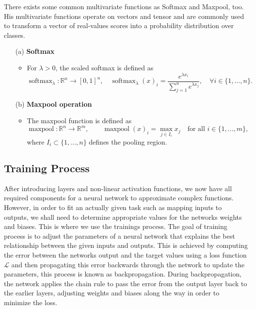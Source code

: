 \newpage

There exists some common multivariate functions as Softmax and Maxpool, too.
His multivariate functions operate on vectors and tensor and are commonly used to transform a vector of real-values scores into a probability distribution over classes. 
\begin{enumerate}
    \item[(a)] \textbf{Softmax}
    \begin{itemize}
        \item For \( \lambda > 0 \), the scaled softmax is defined as
        \[
            \operatorname{softmax}_\lambda: \mathbb{R}^n \to [0,1]^n,\quad 
            \operatorname{softmax}_\lambda(x)_i = \frac{e^{\lambda x_i}}{\sum\limits_{j=1}^{n} e^{\lambda x_j}},\quad \forall i \in \{1, \dots, n\}.
        \]
    \end{itemize}
	\item[(b)] \textbf{Maxpool operation}
	\begin{itemize}
		\item The maxpool function is defined as
		\[
		\operatorname{maxpool}: \mathbb{R}^n \to \mathbb{R}^m, \qquad 
		\operatorname{maxpool}(x)_i = \max_{j \in I_i} x_j 
		\quad \text{for all } i \in \{1, \dots, m\},
		\]
		where \( I_i \subset \{1, \dots, n\} \) defines the pooling region.
	\end{itemize}
\end{enumerate}


\subsection{Training Process}
After introducing layers and non-linear activation functions, we now have all required components for a neural network to approximate complex functions.
However, in order to fit an actually given task such as mapping inputs to outputs, we shall need to determine appropriate values for the networks weights and biases.
This is where we use the trainings process. 
The goal of training process is to adjust the parameters of a neural network that explains the best relationship between the given inputs and outputs.
This is achieved by computing the error between the networks output and the target values using a loss function $\mathcal{L}$ and then propagating this error backwards through the network to update the parameters, this process is known as backpropagation. 
During backpropagation, the network applies the chain rule to pass the error from the output layer back to the earlier layers, adjusting weights and biases along the way in order to minimize the loss.



